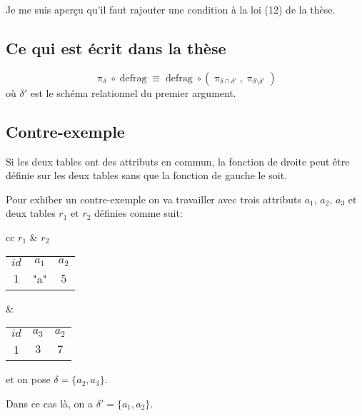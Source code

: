 \documentclass[french]{article}
\DeclareMathOperator{\proj}{\pi}
\DeclareMathOperator{\defrag}{defrag}
\newcommand{\projDelta}{\proj_{\delta}}
\begin{document}
Je me suis aperçu qu'il faut rajouter une condition à la loi (12)
de la thèse.


\subsection*{Ce qui est écrit dans la thèse}
$$
\projDelta \circ \defrag
\equiv \defrag \circ (\proj_{\delta \cap \delta'} , \proj_{\delta \setminus \delta'})
$$
où $\delta'$ est le schéma relationnel du premier argument.
\subsection*{Contre-exemple}
Si les deux tables ont des attributs en commun,
la fonction de droite peut être définie sur les deux tables
sans que la fonction de gauche le soit.

Pour exhiber un contre-exemple on va travailler avec trois attributs $a_1$, $a_2$, $a_3$
et deux tables $r_1$ et $r_2$ définies comme suit:
\begin{center}
\begin{tabular}{cc}
	$r_1$ & $r_2$ \\
	\begin{tabular}{ccc}
		$id$ & $a_1$ & $a_2$ \\
		$1$	& "a"	& $5$
	\end{tabular}
	&
	\begin{tabular}{ccc}
		$id$ & $a_3$ & $a_2$ \\
		1	& $3$		& $7$ 	
	\end{tabular}
\end{tabular}
\end{center}
et on pose $\delta = \{a_2, a_3\}$.

Dans ce cas là, on a
$\delta' = \{a_1, a_2\}$. \\
\end{document}
